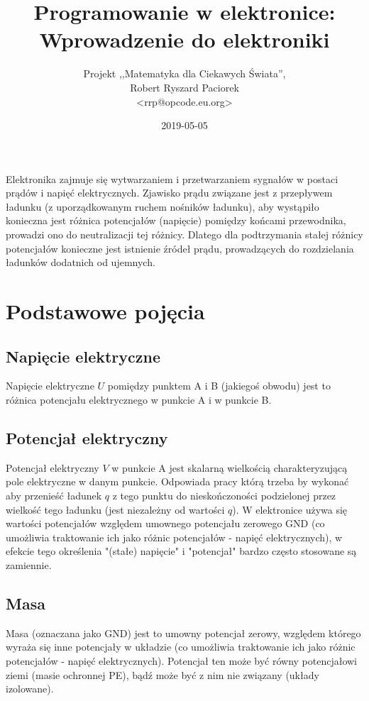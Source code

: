 \documentclass{pdfBooklets}
\title{Programowanie w elektronice: Wprowadzenie do elektroniki}
\author{%
	Projekt ,,Matematyka dla Ciekawych Świata'',\\
	Robert Ryszard Paciorek\\\normalsize\ttfamily <rrp@opcode.eu.org>
}
\date  {2019-05-05}
\begin{document}
\maketitle

Elektronika zajmuje się wytwarzaniem i przetwarzaniem sygnałów w postaci prądów i napięć elektrycznych.
Zjawisko prądu związane jest z przepływem ładunku (z uporządkowanym ruchem nośników ładunku), aby wystąpiło konieczna jest różnica potencjałów (napięcie) pomiędzy końcami przewodnika, prowadzi ono do neutralizacji tej różnicy.
Dlatego dla podtrzymania stałej różnicy potencjałów konieczne jest istnienie źródeł prądu, prowadzących do rozdzielania ładunków dodatnich od ujemnych.

\section{Podstawowe pojęcia}

\subsection{Napięcie elektryczne}
    Napięcie elektryczne $U$ pomiędzy punktem A i B (jakiegoś obwodu)
    jest to różnica potencjału elektrycznego w punkcie A i w punkcie B.
\subsection{Potencjał elektryczny}
    Potencjał elektryczny $V$ w punkcie A
    jest skalarną wielkością charakteryzującą pole elektryczne w danym punkcie. Odpowiada pracy którą trzeba by wykonać aby przenieść ładunek $q$ z tego punktu do nieskończoności podzielonej przez wielkość tego ładunku (jest niezależny od wartości $q$).
    W elektronice używa się wartości potencjałów względem umownego potencjału zerowego GND (co umożliwia traktowanie ich jako różnic potencjałów - napięć elektrycznych), w efekcie tego określenia "(stałe) napięcie" i "potencjał" bardzo często stosowane są zamiennie. 
\subsection{Masa}
   Masa (oznaczana jako GND) jest to
   umowny potencjał zerowy, względem którego wyraża się inne potencjały w układzie (co umożliwia traktowanie ich jako różnic potencjałów - napięć elektrycznych). Potencjał ten może być równy potencjałowi ziemi (masie ochronnej PE), bądź może być z nim nie związany (układy izolowane).
\end{document}
